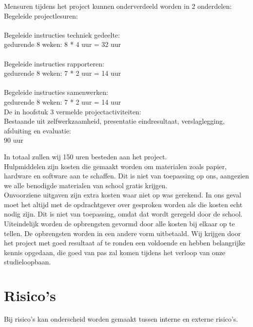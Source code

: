 \documentclass[oneside]{book}
\begin{document}
Mensuren tijdens het project kunnen onderverdeeld worden in 2 onderdelen:
Begeleide projectlesuren: \\
\\
Begeleide instructies techniek gedeelte: \\ 
gedurende 8 weken:  8 * 4  uur  =  32 uur\\
\\
Begeleide instructies rapporteren:\\
gedurende 8 weken: 7 * 2  uur   =  14 uur\\
\\
Begeleide instructies samenwerken:\\
gedurende 8 weken: 7 * 2  uur  =  14  uur\\
                                                      
De in hoofstuk 3 vermelde projectactiviteiten:\\ 
Bestaande uit zelfwerkzaamheid, presentatie eindresultaat, verslaglegging, afsluiting en evaluatie: \\
90 uur

In totaal zullen wij 150 uren besteden aan het project.\\

Hulpmiddelen zijn kosten die gemaakt worden om materialen zoals papier, 
hardware en software aan te schaffen. Dit is niet van toepassing op ons, aangezien
we alle benodigde materialen van school gratis krijgen.\\

Onvoorziene uitgaven zijn extra kosten waar niet op was gerekend. In ons geval
moet het altijd met de opdrachtgever over gesproken worden als die kosten echt
nodig zijn. Dit is niet van toepassing, omdat dat wordt geregeld door de school.\\

Uiteindelijk worden de opbrengsten gevormd door alle kosten bij elkaar op te tellen.
De opbrengsten worden in een andere vorm uitbetaald. 
Wij krijgen door het project met goed resultaat af te ronden een voldoende en hebben belangrijke    
kennis opgedaan, die goed van pas zal komen tijdens het verloop van onze studieloopbaan.
\clearpage
\chapter{Risico's}
Bij risico's kan onderscheid worden gemaakt tussen interne
en externe risico's.
\end{document}
